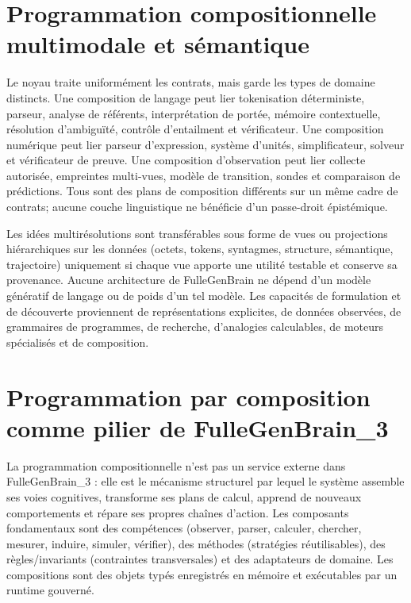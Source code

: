 \documentclass[11pt,a4paper]{article}
\theoremstyle{definition}
\theoremstyle{plain}
\theoremstyle{remark}
\begin{document}
\section{Programmation compositionnelle multimodale et sémantique}
Le noyau traite uniformément les contrats, mais garde les types de domaine distincts. Une composition de langage peut lier tokenisation déterministe, parseur, analyse de référents, interprétation de portée, mémoire contextuelle, résolution d'ambiguïté, contrôle d'entailment et vérificateur. Une composition numérique peut lier parseur d'expression, système d'unités, simplificateur, solveur et vérificateur de preuve. Une composition d'observation peut lier collecte autorisée, empreintes multi-vues, modèle de transition, sondes et comparaison de prédictions. Tous sont des plans de composition différents sur un même cadre de contrats; aucune couche linguistique ne bénéficie d'un passe-droit épistémique.

Les idées multirésolutions sont transférables sous forme de vues ou projections hiérarchiques sur les données (octets, tokens, syntagmes, structure, sémantique, trajectoire) uniquement si chaque vue apporte une utilité testable et conserve sa provenance. Aucune architecture de FulleGenBrain ne dépend d'un modèle génératif de langage ou de poids d'un tel modèle. Les capacités de formulation et de découverte proviennent de représentations explicites, de données observées, de grammaires de programmes, de recherche, d'analogies calculables, de moteurs spécialisés et de composition.

\section{Programmation par composition comme pilier de FulleGenBrain\_3}
La programmation compositionnelle n'est pas un service externe dans FulleGenBrain\_3 : elle est le mécanisme structurel par lequel le système assemble ses voies cognitives, transforme ses plans de calcul, apprend de nouveaux comportements et répare ses propres chaînes d'action. Les composants fondamentaux sont des compétences (observer, parser, calculer, chercher, mesurer, induire, simuler, vérifier), des méthodes (stratégies réutilisables), des règles/invariants (contraintes transversales) et des adaptateurs de domaine. Les compositions sont des objets typés enregistrés en mémoire et exécutables par un runtime gouverné.
\end{document}
